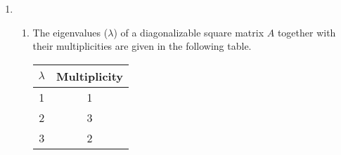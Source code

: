 \documentclass{zc-ust-hw}
\begin{document}
\begin{enumerate}
  \item \, 
    \begin{enumerate}
      \item The eigenvalues (\(\lambda\))  of a diagonalizable square matrix \(A\) together
        with their multiplicities are given in the following table. 
        \begin{table}[H]
        \begin{center}
          \begin{tabular}[c]{|c|c|}
            \hline
            \(\lambda\) & \textbf{Multiplicity} \\
            \hline
            1 & 1 \\
            2 & 3 \\
            3 & 2 \\
            \hline
          \end{tabular}
        \end{center}
       \end{table}


\end{enumerate}
\end{enumerate}
\end{document}
